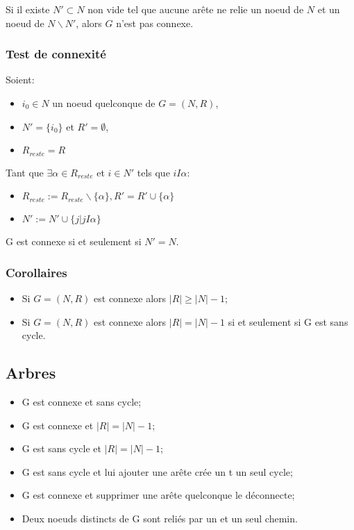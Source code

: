 Si il existe $N' \subset N$ non vide tel que aucune arête ne relie
un noeud de $N$ et un noeud de $N\backslash N'$, alors $G$ n'est pas connexe.

\subsubsection*{Test de connexité}
Soient:
\begin{itemize}
  \item $i_0 \in N$ un noeud quelconque de $G = (N,R)$,\\
  \item $N' = \{i_0\}$ et $R' = \emptyset$,\\
  \item $R_{reste} = R$\\
\end{itemize}
Tant que $\exists \alpha \in R_{reste}$ et $i \in N'$ tels que $iI\alpha$:
\begin{itemize}
  \item $R_{reste} := R_{reste}\backslash \{\alpha\},
    R' = R' \cup \{\alpha\}$\\
  \item $N' := N' \cup \{j | jI\alpha\}$\\
\end{itemize}
G est connexe si et seulement si $N' = N$.
\subsubsection*{Corollaires}
\begin{itemize}
  \item Si $G = (N,R)$ est connexe alors $|R| \geq |N| - 1$;
  \item Si $G = (N,R)$ est connexe alors $|R| = |N| - 1$
    si et seulement si G est sans cycle.
\end{itemize}

\subsection{Arbres}
\begin{itemize}
  \item G est connexe et sans cycle;
  \item G est connexe et $|R| = |N| - 1$;
  \item G est sans cycle et $|R| = |N| - 1$;
  \item G est sans cycle et lui ajouter une arête crée un t un seul cycle;
  \item G est connexe et supprimer une arête quelconque le déconnecte;
  \item Deux noeuds distincts de G sont reliés par un et un seul chemin.
\end{itemize}

